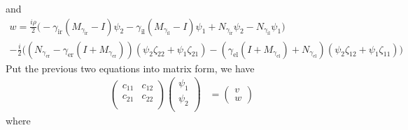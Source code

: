 and
\begin{multline*}
  w = \frac{i \rho}{2} \bigl(-\gamma_\text{ir} (M_{\gamma_\text{ir}}-I)\psi_2 -\gamma_\text{il}(M_{\gamma_\text{il}}-I) \psi_1 +N_{\gamma_\text{ir}} \psi_2-N_{\gamma_\text{il}} \psi_1\bigr) \\
  - \frac{i}{2}\bigl((N_{\gamma_\text{er}}-\gamma_\text{er} (I+M_{\gamma_\text{er}}))(\psi_2 \zeta_{22}+\psi_1 \zeta_{21})-(\gamma_\text{el} (I+M_{\gamma_\text{el}})+N_{\gamma_\text{el}})(\psi_2 \zeta_{12}+\psi_1 \zeta_{11})\bigr)
\end{multline*}
Put the previous two equations into matrix form, we have
\begin{align*}
  \begin{pmatrix}
    c_{11} & c_{12}\\
    c_{21} & c_{22}\\
  \end{pmatrix} 
  \begin{pmatrix}
    \psi_1 \\ \psi_2 \\ 
  \end{pmatrix} &=
  \begin{pmatrix}
    v \\ w 
  \end{pmatrix}
\end{align*}
where
